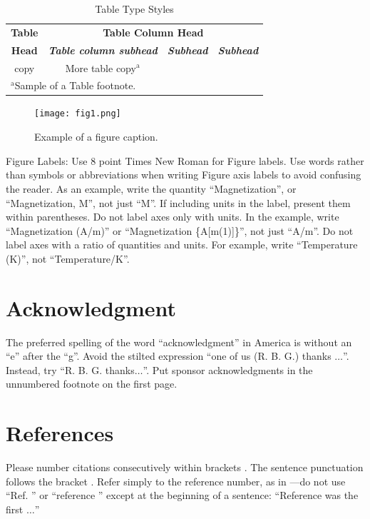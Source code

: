 \documentclass[conference]{IEEEtran}
\begin{document}
\begin{table}[htbp]
\caption{Table Type Styles}
\begin{center}
\begin{tabular}{|c|c|c|c|}
\hline
\textbf{Table}&\multicolumn{3}{|c|}{\textbf{Table Column Head}} \\
\cline{2-4} 
\textbf{Head} & \textbf{\textit{Table column subhead}}& \textbf{\textit{Subhead}}& \textbf{\textit{Subhead}} \\
\hline
copy& More table copy$^{\mathrm{a}}$& &  \\
\hline
\multicolumn{4}{l}{$^{\mathrm{a}}$Sample of a Table footnote.}
\end{tabular}
\label{tab1}
\end{center}
\end{table}

\begin{figure}[htbp]
\centerline{\texttt{[image: fig1.png]}}
\caption{Example of a figure caption.}
\label{fig}
\end{figure}

Figure Labels: Use 8 point Times New Roman for Figure labels. Use words 
rather than symbols or abbreviations when writing Figure axis labels to 
avoid confusing the reader. As an example, write the quantity 
``Magnetization'', or ``Magnetization, M'', not just ``M''. If including 
units in the label, present them within parentheses. Do not label axes only 
with units. In the example, write ``Magnetization (A/m)'' or ``Magnetization 
\{A[m(1)]\}'', not just ``A/m''. Do not label axes with a ratio of 
quantities and units. For example, write ``Temperature (K)'', not 
``Temperature/K''.

\section*{Acknowledgment}

The preferred spelling of the word ``acknowledgment'' in America is without 
an ``e'' after the ``g''. Avoid the stilted expression ``one of us (R. B. 
G.) thanks $\ldots$''. Instead, try ``R. B. G. thanks$\ldots$''. Put sponsor 
acknowledgments in the unnumbered footnote on the first page.

\section*{References}

Please number citations consecutively within brackets \cite{b1}. The 
sentence punctuation follows the bracket \cite{b2}. Refer simply to the reference 
number, as in \cite{b3}---do not use ``Ref. \cite{b3}'' or ``reference \cite{b3}'' except at 
the beginning of a sentence: ``Reference \cite{b3} was the first $\ldots$''
\end{document}
